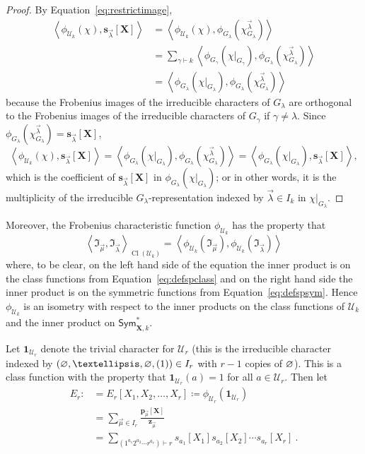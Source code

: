 \documentclass[10pt]{amsart}
\theoremstyle{definition}
\theoremstyle{remark}
\newcommand{\ind}{\mathfrak{I}}
\newcommand{\XXX}{\mathbf{X}}
\newcommand{\epart}{\text{\footnotesize$\varnothing$}}
\newcommand{\class}{\operatorname{Cl}}
\begin{document}
\begin{proof}
By Equation~\eqref{eq:restrictimage},
\begin{align*}
\left< \phi_{\mathcal{U}_k}( \chi ), \mathbf{s}_{\vec{\lambda}}[\XXX] \right>
&=\left< \phi_{\mathcal{U}_k}( \chi ),
\phi_{G_\lambda}( \chi^{\vec{\lambda}}_{G_\lambda}) \right>\\
&=
\sum_{\gamma \vdash k}
\left< \phi_{G_\gamma}( \chi |_{G_\gamma}),
\phi_{G_\lambda}( \chi^{\vec{\lambda}}_{G_\lambda}) \right>\\
&=
\left< \phi_{G_\lambda}( \chi |_{G_\lambda}),
\phi_{G_\lambda}( \chi^{\vec{\lambda}}_{G_\lambda}) \right>
\end{align*}
because the Frobenius images of the irreducible characters of $G_\lambda$
are orthogonal to the Frobenius images of the
irreducible characters of $G_\gamma$ if $\gamma \neq \lambda$.
Since $\phi_{G_\lambda}( \chi^{\vec{\lambda}}_{G_\lambda}) =
\mathbf{s}_{\vec{\lambda}}[\XXX]$,
\[
    \left< \phi_{\mathcal{U}_k}( \chi ), \mathbf{s}_{\vec{\lambda}}[\XXX] \right>
    =
    \left< \phi_{G_\lambda}( \chi |_{G_\lambda}),
    \phi_{G_\lambda}( \chi^{\vec{\lambda}}_{G_\lambda}) \right>
    = \left< \phi_{G_\lambda}( \chi |_{G_\lambda}), \mathbf{s}_{\vec{\lambda}}[\XXX] \right>,
\]
which is the coefficient of $\mathbf{s}_{\vec{\lambda}}[\XXX]$ in
$\phi_{G_\lambda}( \chi |_{G_\lambda})$;
or in other words, it is the multiplicity of the
irreducible $G_\lambda$-representation
indexed by $\vec{\lambda} \in I_k$ in $\chi |_{G_\lambda}$.
\end{proof}

Moreover, the Frobenius characteristic function $\phi_{\mathcal{U}_k}$ has the property that
$$\left< \ind_{\vec{\mu}},
\ind_{\vec{\lambda}} \right>_{\class(\mathcal{U}_k)}
= \left< \phi_{\mathcal{U}_k}( \ind_{\vec{\mu}} ),
\phi_{\mathcal{U}_k}( \ind_{\vec{\lambda}} )\right>$$
where, to be clear, on the left hand side of the equation the inner
product is on the class functions from Equation~\eqref{eq:defspclass}
and on the right hand side the inner product is on the symmetric functions
from Equation~\eqref{eq:defspsym}. Hence $\phi_{\mathcal{U}_k}$ is an isometry with respect to the
inner products on the class functions of $\mathcal{U}_k$ and
the inner product on $\mathsf{Sym}^{\ast}_{\XXX,k}$.

Let $\mathbf{1}_{\mathcal{U}_r}$ denote the trivial character for $\mathcal{U}_r$
(this is the irreducible character indexed by $(\epart, \ldots, \epart, (1)) \in I_r$ with $r-1$ copies of $\epart$).
This is a class function with the property that $\mathbf{1}_{\mathcal{U}_r}(a) = 1$ for all $a \in \mathcal{U}_r$.
Then let
\begin{align}
E_r:&= E_r[X_1, X_2, \ldots, X_r] \coloneqq \phi_{\mathcal{U}_r}(\mathbf{1}_{\mathcal{U}_r})\label{def:Ed}\\
&= \sum_{\vec{\mu} \in I_r} \frac{\mathbf{p}_{\vec{\mu}}[\XXX]}{\mathbf{z}_{\vec{\mu}}}\label{eq:Edpexp}\\
&= \sum_{(1^{a_1}2^{a_2}\cdots r^{a_r}) \vdash r}
s_{a_1}[X_1] s_{a_2}[X_2] \cdots s_{a_r}[X_r]~.\label{eq:Edsexp}
\end{align}
\end{document}

